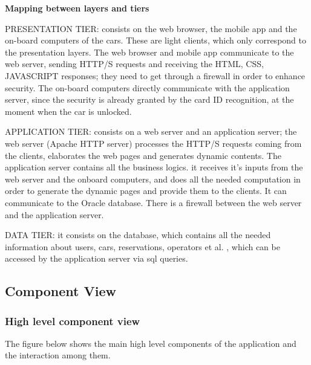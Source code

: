 \documentclass{article}
\begin{document}
\begin{flushleft}
\textbf{Mapping between layers and tiers}
\begin{description}
\item PRESENTATION TIER: consists on the web browser, the mobile app and the on-board computers of the cars. These are light clients, which only correspond to the presentation layers. The web browser and mobile app communicate to the web server, sending HTTP/S requests and receiving the HTML, CSS, JAVASCRIPT responses;  they need to get through a firewall in order to enhance security. The on-board computers directly communicate with the application server, since the security is already granted by the card ID recognition, at the moment when the car is unlocked.
\item APPLICATION TIER: consists on a web server and an application server; the web server (Apache HTTP server) processes the HTTP/S requests coming from the clients, elaborates the web pages and generates dynamic contents. The application server contains all the business logics. it receives it's inputs from the web server and the onboard computers, and does all the needed computation in order to generate the dynamic pages and  provide them 
to the clients. It can communicate to the Oracle database. There is a firewall between the web server and the application server.
\item DATA TIER:  it consists on the database, which contains all the needed information about users, cars, reservations, operators et al. , which can be accessed by the application server via sql queries.


\end{description}







\subsection{Component View}  %
\subsubsection{High level component view} %
The figure below shows the main high level components of the application and the interaction among them.
\vspace{1.5cm}



\end{flushleft}
\end{document}
